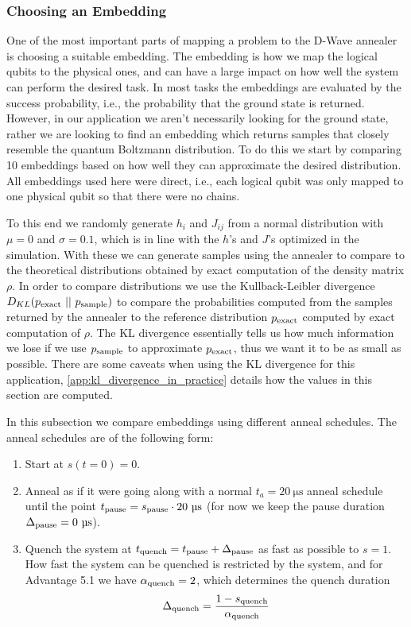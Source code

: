\subsubsection{Choosing an Embedding}
One of the most important parts of mapping a problem to the D-Wave annealer is choosing a suitable embedding.
The embedding is how we map the logical qubits to the physical ones, and can have a large impact on how well the system can perform the desired task.
In most tasks the embeddings are evaluated by the success probability, i.e., the probability that the ground state is returned.
However, in our application we aren't necessarily looking for the ground state, rather we are looking to find an embedding which returns samples that closely resemble the quantum Boltzmann distribution.
To do this we start by comparing 10 embeddings based on how well they can approximate the desired distribution.
All embeddings used here were direct, i.e., each logical qubit was only mapped to one physical qubit so that there were no chains.

To this end we randomly generate \( h_i \) and \( J_{ij} \) from a normal distribution with \( \mu = 0 \) and \( \sigma = 0.1 \), which is in line with the \( h \)'s and \( J \)'s optimized in the simulation.
With these we can generate samples using the annealer to compare to the theoretical distributions obtained by exact computation of the density matrix \( \rho \).
In order to compare distributions we use the Kullback-Leibler divergence \( D_{KL}(p_{\text{exact}} \ || \ p_{\text{sample}}) \) to compare the probabilities computed from the samples returned by the annealer to the reference distribution \( p_{\text{exact}} \) computed by exact computation of \( \rho \).
The KL divergence essentially tells us how much information we lose if we use \( p_{\text{sample}} \) to approximate \( p_{\text{exact}} \), thus we want it to be as small as possible.
There are some caveats when using the KL divergence for this application, \cref{app:kl_divergence_in_practice} details how the values in this section are computed.

In this subsection we compare embeddings using different anneal schedules.
The anneal schedules are of the following form:
\begin{enumerate}
    \item Start at \( s(t = 0) = 0 \).
    \item Anneal as if it were going along with a normal \( t_a = 20 \ \si{\micro\second} \) anneal schedule until the point \( t_{\text{pause}} = s_{\text{pause}} \cdot 20 \ \si{\micro\second} \) (for now we keep the pause duration \( \Deltapause = 0 \ \si{\micro\second} \)).
    \item Quench the system at \( t_{\text{quench}} = t_{\text{pause}} + \Delta_{\text{pause}} \) as fast as possible to \( s = 1 \).
        How fast the system can be quenched is restricted by the system, and for Advantage 5.1 we have \( \alpha_{\text{quench}} = 2 \), which determines the quench duration
        \[
            \Delta_{\text{quench}} = \frac{1 - s_{\text{quench}}}{\alpha_{\text{quench}}}
        \]
\end{enumerate}

